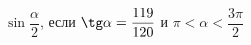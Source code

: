 \begin{ex}[type=simplify_calculate]
	\begin{condition}
		\( \sin\dfrac{\alpha}{2} \), \quad если \( \tg\alpha=\dfrac{119}{120} \) и \( \pi<\alpha<\dfrac{3\pi}{2} \)
	\end{condition}
\end{ex}